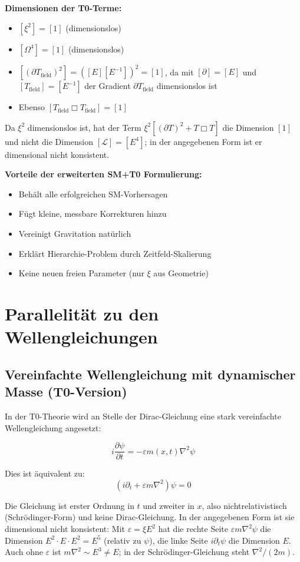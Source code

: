 	\textbf{Dimensionen der T0-Terme:}
	\begin{itemize}
		\item $[\xi^2] = [1]$ (dimensionslos)
		\item $[\Omega^4] = [1]$ (dimensionslos)
		\item $[(\partial T_{\text{field}})^2] = ([E][E^{-1}])^2 = [1]$, da mit $[\partial] = [E]$ und $[T_{\text{field}}] = [E^{-1}]$ der Gradient $\partial T_{\text{field}}$ dimensionslos ist
		\item Ebenso $[T_{\text{field}}\Box T_{\text{field}}] = [1]$
	\end{itemize}
	Da $\xi^2$ dimensionslos ist, hat der Term $\xi^2[(\partial T)^2 + T\Box T]$ die Dimension $[1]$ und nicht die Dimension $[\mathcal{L}] = [E^4]$; in der angegebenen Form ist er dimensional nicht konsistent.
	
	\textbf{Vorteile der erweiterten SM+T0 Formulierung:}
	\begin{itemize}
		\item Behält alle erfolgreichen SM-Vorhersagen
		\item Fügt kleine, messbare Korrekturen hinzu
		\item Vereinigt Gravitation natürlich
		\item Erklärt Hierarchie-Problem durch Zeitfeld-Skalierung
		\item Keine neuen freien Parameter (nur $\xi$ aus Geometrie)
	\end{itemize}
	
	\section{Parallelität zu den Wellengleichungen}
	
	\subsection{Vereinfachte Wellengleichung mit dynamischer Masse (T0-Version)}
	
	In der T0-Theorie wird an Stelle der Dirac-Gleichung eine stark vereinfachte Wellengleichung angesetzt:
	
	\begin{t0box}[T0-Wellengleichung]
		\begin{equation}
			i\frac{\partial\psi}{\partial t} = -\varepsilon m(x,t) \nabla^2 \psi
		\end{equation}
		
		Dies ist äquivalent zu:
		\begin{equation}
			(i\partial_t + \varepsilon m \nabla^2)\psi = 0
		\end{equation}
	\end{t0box}
	Die Gleichung ist erster Ordnung in $t$ und zweiter in $x$, also nichtrelativistisch (Schrödinger-Form) und keine Dirac-Gleichung. In der angegebenen Form ist sie dimensional nicht konsistent: Mit $\varepsilon = \xi E^2$ hat die rechte Seite $\varepsilon m \nabla^2\psi$ die Dimension $E^2 \cdot E \cdot E^2 = E^5$ (relativ zu $\psi$), die linke Seite $i\partial_t\psi$ die Dimension $E$. Auch ohne $\varepsilon$ ist $m\nabla^2 \sim E^3 \neq E$; in der Schrödinger-Gleichung steht $\nabla^2/(2m)$.
	
